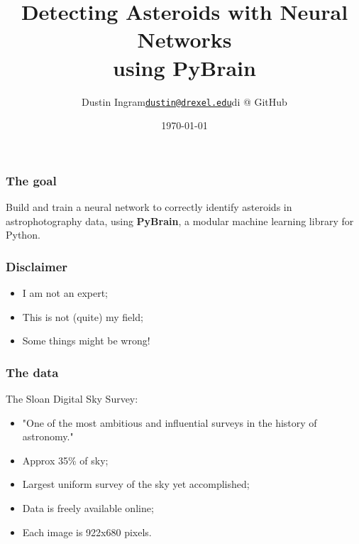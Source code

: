 \documentclass{beamer}
\title{Detecting Asteroids with Neural Networks\\ using PyBrain}
\author{
    \texorpdfstring{Dustin Ingram\newline\texttt{\href{mailto:dustin@drexel.edu}{dustin@drexel.edu}}\newline di @ GitHub}{Author}
}
\institute{Philly Python Users Group}
\date{\today}
\begin{document}
\maketitle

\begin{frame}
    \frametitle{The goal}
    Build and train a neural network to correctly identify asteroids in
    astrophotography data, using \textbf{PyBrain}, a modular machine learning
    library for Python.
\end{frame}

\begin{frame}
    \frametitle{Disclaimer}
    \begin{itemize}
        \item I am not an expert;
        \item This is not (quite) my field;
        \item Some things might be wrong!
    \end{itemize}
\end{frame}

\begin{frame}
    \frametitle{The data}
    The Sloan Digital Sky Survey:
    \begin{itemize}
        \item "One of the most ambitious and influential surveys in the history
        of astronomy."
        \item Approx 35\% of sky;
        \item Largest uniform survey of the sky yet accomplished;
        \item Data is freely available online;
        \item Each image is 922x680 pixels.
    \end{itemize}
\end{frame}

{
    \begin{frame}[plain] \end{frame}
}
\end{document}
